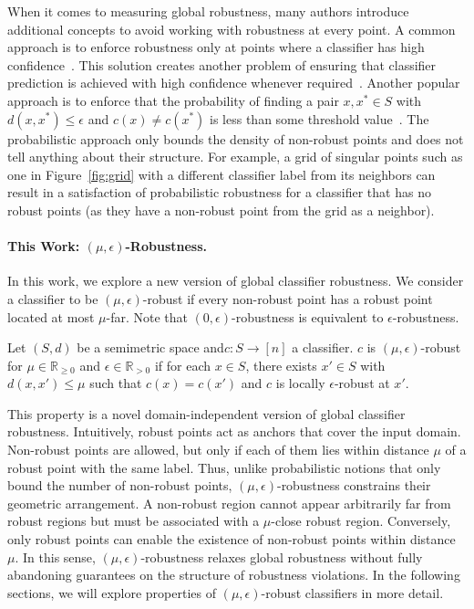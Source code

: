 When it comes to measuring global robustness, many authors introduce additional concepts to avoid working with robustness at every point. A common approach is to enforce robustness only at points where a classifier has high confidence~\cite{athavale2024verifying,leino2021globally}. This solution creates another problem of ensuring that classifier prediction is achieved with high confidence whenever required~\cite{el2010foundations,chow1970optimum}. Another popular approach is to enforce that the probability of finding a pair $x, x^*\in S$ with $d(x,x^*) \leq \epsilon$ and $c(x) \neq c(x^*)$ is less than some threshold value~\cite{levy2023groma,li2024certifying,mangal2019robustness}. The probabilistic approach only bounds the density of non-robust points and does not tell anything about their structure. For example, a grid of singular points such as one in Figure~\ref{fig:grid} with a different classifier label from its neighbors can result in a satisfaction of probabilistic robustness for a classifier that has no robust points (as they have a non-robust point from the grid as a neighbor).

\paragraph{This Work: $(\mu,\epsilon)$-Robustness.} In this work, we explore a new version of global classifier robustness. We consider a classifier to be $(\mu,\epsilon)$-robust if every non-robust point has a robust point located at most $\mu$-far. Note that $(0,\epsilon)$-robustness is equivalent to $\epsilon$-robustness.
\begin{definition}
\label{def:mueps}
Let $(S,d)$ be a semimetric space and\linebreak $c: S \rightarrow [n]$ a classifier. $c$ is $(\mu, \epsilon)$-robust for $\mu \in \mathbb{R}_{\geq0}$ and $\epsilon \in \mathbb{R}_{>0}$ if for each $x \in S$, there exists $x' \in S$ with $d(x,x') \leq \mu$ such that $c(x) = c(x')$ and $c$ is locally $\epsilon$-robust at $x'$.
\end{definition}

This property is a novel domain-independent version of global classifier robustness. Intuitively, robust points act as anchors that cover the input domain. Non-robust points are allowed, but only if each of them lies within distance $\mu$ of a robust point with the same label. Thus, unlike probabilistic notions that only bound the number of non-robust points, $(\mu,\epsilon)$-robustness constrains their geometric arrangement. A non-robust region cannot appear arbitrarily far from robust regions but must be associated with a $\mu$-close robust region. Conversely, only robust points can enable the existence of non-robust points within distance $\mu$. In this sense, $(\mu,\epsilon)$-robustness relaxes global robustness without fully abandoning guarantees on the structure of robustness violations. In the following sections, we will explore properties of $(\mu,\epsilon)$-robust classifiers in more detail.